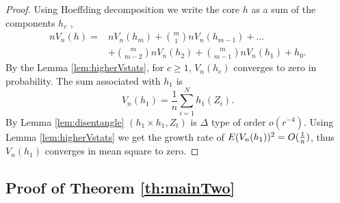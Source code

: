 \begin{proof}
Using  Hoeffding decomposition we  write the core  $h$ as a sum of the components $h_c$ ,
\begin{align*}
  n V_n(h) =& n V_n(h_m) + \binom m 1 n V_n(h_{m-1}) + ... \\ 
  &+ \binom {m} {m-2} n V_n(h_{2}) + \binom {m} {m-1} n V_n(h_{1})+h_0.
\end{align*}
By the  Lemma \ref{lem:higherVstats}, for $c \geq 1$, $V_n(h_{c})$  converges to zero in probability. The sum associated with $h_1$ is
\[
V_n(h_1) = \frac 1 n \sum_{i=1}^{N} h_1(Z_i).
\]
By Lemma \ref{lem:disentangle}  $(h_1 \times h_1,Z_t)$ is $\varDelta$ type of order  $o(r^{-4})$. Using Lemma \ref{lem:higherVstats} we get the growth rate of 
$ E (V_n(h_1))^2= O(\frac 1 n)$, thus $V_n(h_1)$ converges in mean square to zero.
\end{proof}


\subsection{Proof of Theorem \ref{th:mainTwo}}
\label{sec:prMainTwo}




